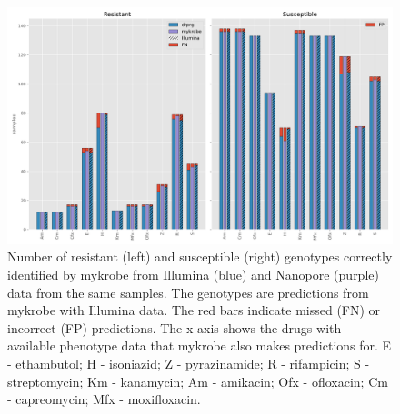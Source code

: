 \begin{figure}
\begin{center}
\includegraphics[width=0.90\columnwidth]{Chapter3/Figs/illumina_concordance.png}
\caption{{Number of resistant (left) and susceptible (right) genotypes correctly identified by mykrobe from Illumina (blue) and Nanopore (purple) data from the same samples. The genotypes are predictions from mykrobe with Illumina data. The red bars indicate missed (FN) or incorrect (FP) predictions. The x-axis shows the drugs with available phenotype data that mykrobe also makes predictions for. E - ethambutol; H - isoniazid; Z - pyrazinamide; R - rifampicin; S - streptomycin; Km - kanamycin; Am - amikacin; Ofx - ofloxacin; Cm - capreomycin; Mfx - moxifloxacin.
{\label{fig:geno-concordance}}
}}
\end{center}
\end{figure}

